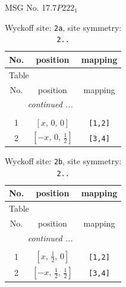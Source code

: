 \documentclass[fleqn,8pt]{jsarticle}
\begin{document}
\setcounter{MaxMatrixCols}{32}

\renewcommand{\tablename}{Table~}
\renewcommand{\figurename}{Figure~}
\begin{center}
\LARGE
MSG No. 17.7\quad$P222_{1}$
\end{center}
\renewcommand{\arraystretch}{1.2}
\begin{longtable}{ccc}
\caption{Wyckoff site: {\tt 2a}, site symmetry: {\tt 2..}}
 \\
 \hline \hline
No. & position & mapping \\ \hline \endfirsthead

\multicolumn{2}{l}{\tablename\ \thetable{}} \\
 \hline \hline
No. & position & mapping \\ \hline \endhead

 \hline \hline
\multicolumn{2}{r}{\footnotesize\it continued ...} \\ \endfoot

 \hline \hline
\multicolumn{2}{r}{} \\ \endlastfoot

1 & $\left[ x,\, 0,\, 0 \right]$ & {\tt [1,2]} \\ \hline
2 & $\left[ - x,\, 0,\, \frac{1}{2} \right]$ & {\tt [3,4]} \\
\end{longtable}
\renewcommand{\arraystretch}{1.2}
\begin{longtable}{ccc}
\caption{Wyckoff site: {\tt 2b}, site symmetry: {\tt 2..}}
 \\
 \hline \hline
No. & position & mapping \\ \hline \endfirsthead

\multicolumn{2}{l}{\tablename\ \thetable{}} \\
 \hline \hline
No. & position & mapping \\ \hline \endhead

 \hline \hline
\multicolumn{2}{r}{\footnotesize\it continued ...} \\ \endfoot

 \hline \hline
\multicolumn{2}{r}{} \\ \endlastfoot

1 & $\left[ x,\, \frac{1}{2},\, 0 \right]$ & {\tt [1,2]} \\ \hline
2 & $\left[ - x,\, \frac{1}{2},\, \frac{1}{2} \right]$ & {\tt [3,4]} \\
\end{longtable}
\renewcommand{\arraystretch}{1.2}
\end{document}
